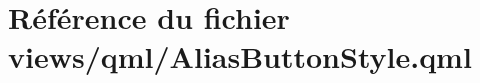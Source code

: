 \hypertarget{AliasButtonStyle_8qml}{\section{Référence du fichier views/qml/\-Alias\-Button\-Style.qml}
\label{AliasButtonStyle_8qml}
}
